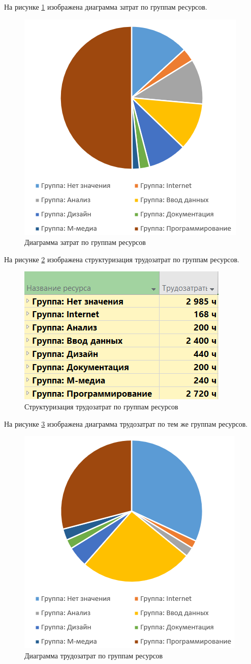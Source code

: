 На рисунке \ref{d1} изображена диаграмма затрат по группам ресурсов.
\begin{figure}[!h]
\centering
\includegraphics[width=0.6\linewidth]{inc/img/d1.png}
\caption{Диаграмма затрат по группам ресурсов}
\label{d1}
\end{figure}

\newpage
На рисунке \ref{p8} изображена структуризация трудозатрат по группам ресурсов.
\begin{figure}[!h]
	\centering
	\includegraphics[width=0.6\linewidth]{inc/img/8.png}
	\caption{Структуризация трудозатрат по группам ресурсов}
	\label{p8}
\end{figure}

На рисунке \ref{d2} изображена диаграмма трудозатрат по тем же группам ресурсов.
\begin{figure}[!h]
	\centering
	\includegraphics[width=0.6\linewidth]{inc/img/d2.png}
	\caption{Диаграмма трудозатрат по группам ресурсов}
	\label{d2}
\end{figure}

